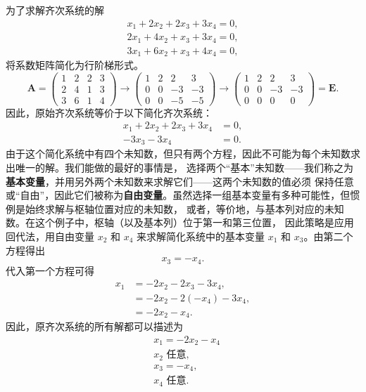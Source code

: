 为了求解齐次系统的解
\[
\begin{array}{c}
    x_1 + 2x_2 + 2x_3 + 3x_4 = 0, \\
    2x_1 + 4x_2 + x_3 + 3x_4 = 0, \\
    3x_1 + 6x_2 + x_3 + 4x_4 = 0,
\end{array}
\]
将系数矩阵简化为行阶梯形式。
\[
\mathbf{A} = 
\left(\begin{array}{cccc}
1 & 2 & 2 & 3 \\
2 & 4 & 1 & 3 \\
3 & 6 & 1 & 4
\end{array}\right)\to
\left(\begin{array}{cccc}
1 & 2 & 2 & 3 \\
0 & 0 & -3 & -3 \\
0 & 0 & -5 & -5
\end{array}\right)\to
\left(\begin{array}{cccc}
1 & 2 & 2 & 3 \\
0 & 0 & -3 & -3 \\
0 & 0 & 0 & 0
\end{array}\right)
= \mathbf{E}.
\]
因此，原始齐次系统等价于以下简化齐次系统：
\[
\begin{aligned}
    x_1 + 2x_2 + 2x_3 + 3x_4 &= 0, \\
    -3x_3 - 3x_4 &= 0.
\end{aligned}
\]
由于这个简化系统中有四个未知数，但只有两个方程，因此不可能为每个未知数求出唯一的解。我们能做的最好的事情是，
选择两个“基本”未知数——我们称之为\textbf{基本变量}，并用另外两个未知数来求解它们——这两个未知数的值必须
保持任意或“自由”，因此它们被称为\textbf{自由变量}。虽然选择一组基本变量有多种可能性，但惯例是始终求解与枢轴位置对应的未知数，
或者，等价地，与基本列对应的未知数。在这个例子中，枢轴（以及基本列）位于第一和第三位置，
因此策略是应用回代法，用自由变量 \(x_2\) 和 \(x_4\) 来求解简化系统中的基本变量 \(x_1\) 和 \(x_3\)。由第二个方程得出
\[
x_3 = -x_4.
\]
代入第一个方程可得
\[
\begin{aligned}
x_1 &= -2x_2 -2x_3 - 3x_4, \\
&= -2x_2 - 2(-x_4) - 3x_4, \\
&= -2x_2 - x_4.
\end{aligned}
\]
因此，原齐次系统的所有解都可以描述为
\[
\begin{aligned}
    &x_1 = -2x_2 - x_4 \\
    &x_2 \text{ 任意}, \\
    &x_3 = -x_4, \\
    &x_4 \text{ 任意}.
\end{aligned}
\]
